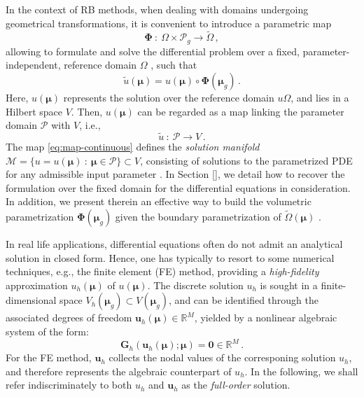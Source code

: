 \documentclass[12pt, a4paper, twoside, openright]{report}
\numberwithin{equation}{chapter}
\theoremstyle{theorem}
\theoremstyle{definition}
\theoremstyle{remark}
\theoremstyle{proposition}
\numberwithin{figure}{chapter}
\newcommand{\wt}[1]{\widetilde{#1}}
\begin{document}
		In the context of RB methods, when dealing with domains undergoing geometrical transformations, it is convenient to introduce a parametric map 
		\begin{equation*}
			\label{eq:geometric-map}
			\boldsymbol{\Phi} ~ : ~ \Omega \times \mathcal{P}_g \rightarrow \wt{\Omega} \, ,
		\end{equation*}
		allowing to formulate and solve the differential problem over a fixed, parameter-independent, reference domain $\Omega$ \cite{MN16}, such that 
		\begin{equation*}
			\wt{u}(\boldsymbol{\mu}) = u(\boldsymbol{\mu}) \circ \boldsymbol{\Phi}(\boldsymbol{\mu}_g) \, .
		\end{equation*}
		Here, $u(\boldsymbol{\mu})$ represents the solution over the reference domain $u\Omega$, and lies in a Hilbert space $V$. Then, $u(\boldsymbol{\mu})$ can be regarded as a map linking the parameter domain $\mathcal{P}$ with $V$, i.e.,
		\begin{equation}
			\label{eq:map-continuous}
			\wt{u} ~ : ~ \mathcal{P} \rightarrow V \, .
		\end{equation}
		The map \eqref{eq:map-continuous} defines the \emph{solution manifold} $\mathcal{M} = \big\lbrace u = u(\boldsymbol{\mu}) ~ : ~ \boldsymbol{\mu} \in \mathcal{P} \big\rbrace \subset V$, consisting of solutions to the parametrized PDE for any admissible input parameter \cite{HSR16}. In Section \ref{}, we detail how to recover the formulation over the fixed domain for the differential equations in consideration. In addition, we present therein an effective way to build the volumetric parametrization $\boldsymbol{\Phi}(\boldsymbol{\mu}_g)$ given the boundary parametrization of $\wt{\Omega}(\boldsymbol{\mu})$ \cite{JIR14}.
		 
		In real life applications, differential equations often do not admit an analytical solution in closed form. Hence, one has typically to resort to some numerical techniques, e.g., the finite element (FE) method, providing a \emph{high-fidelity} approximation $u_h(\boldsymbol{\mu})$ of $u(\boldsymbol{\mu})$. The discrete solution $u_h$ is sought in a finite-dimensional space $V_h(\boldsymbol{\mu}_g) \subset V(\boldsymbol{\mu}_g)$, and can be identified through the associated degrees of freedom $\mathbf{u}_h(\boldsymbol{\mu}) \in \mathbb{R}^M$, yielded by a nonlinear algebraic system of the form:
		\begin{equation}
			\label{eq:nonlinear-system-full}
			\boldsymbol{G}_h(\mathbf{u}_h(\boldsymbol{\mu}); \boldsymbol{\mu}) = \boldsymbol{0} \in \mathbb{R}^M \, .
		\end{equation}
		For the FE method, $\mathbf{u}_h$ collects the nodal values of the corresponing solution $u_h$, and therefore represents the algebraic counterpart of $u_h$. In the following, we shall refer indiscriminately to both $u_h$ and $\mathbf{u}_h$ as the \emph{full-order} solution.
		
\end{document}
